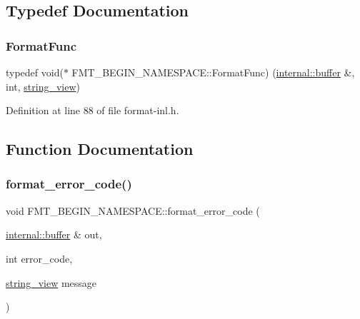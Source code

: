 \subsection{Typedef Documentation}
\mbox{\label{namespace_f_m_t___b_e_g_i_n___n_a_m_e_s_p_a_c_e_a6da944ca5d9656fe12a5c1f629f665ff}} 
\subsubsection{\texorpdfstring{Format\+Func}{FormatFunc}}
{\footnotesize\ttfamily typedef void($\ast$ F\+M\+T\+\_\+\+B\+E\+G\+I\+N\+\_\+\+N\+A\+M\+E\+S\+P\+A\+C\+E\+::\+Format\+Func) (\hyperlink{namespaceinternal_a5fcdbc3efad1f390e6c3f0fdafa56122}{internal\+::buffer} \&, int, \hyperlink{core_8h_a17e3ff7f9ac2b8f068f719b829890036}{string\+\_\+view})}



Definition at line 88 of file format-\/inl.\+h.



\subsection{Function Documentation}
\mbox{\label{namespace_f_m_t___b_e_g_i_n___n_a_m_e_s_p_a_c_e_ad71fe6b856abb34c3351b17daaaae709}} 
\subsubsection{\texorpdfstring{format\+\_\+error\+\_\+code()}{format\_error\_code()}}
{\footnotesize\ttfamily void F\+M\+T\+\_\+\+B\+E\+G\+I\+N\+\_\+\+N\+A\+M\+E\+S\+P\+A\+C\+E\+::format\+\_\+error\+\_\+code (\begin{DoxyParamCaption}\item[{\hyperlink{namespaceinternal_a5fcdbc3efad1f390e6c3f0fdafa56122}{internal\+::buffer} \&}]{out,  }\item[{int}]{error\+\_\+code,  }\item[{\hyperlink{core_8h_a17e3ff7f9ac2b8f068f719b829890036}{string\+\_\+view}}]{message }\end{DoxyParamCaption})}



